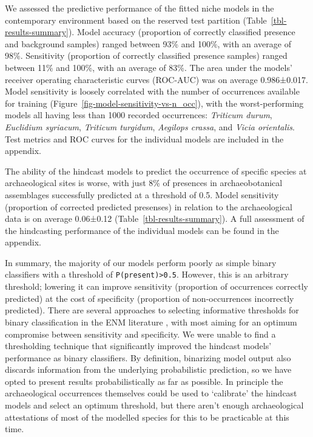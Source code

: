 \documentclass[
  authoryear,
  preprint]{elsarticle}
\begin{document}
We assessed the predictive performance of the fitted niche models in the
contemporary environment based on the reserved test partition
(Table~\ref{tbl-results-summary}). Model accuracy (proportion of
correctly classified presence and background samples) ranged between
93\% and 100\%, with an average of 98\%. Sensitivity (proportion of
correctly classified presence samples) ranged between 11\% and 100\%,
with an average of 83\%. The area under the models' receiver operating
characteristic curves (ROC-AUC) was on average 0.986±0.017. Model
sensitivity is loosely correlated with the number of occurrences
available for training (Figure~\ref{fig-model-sensitivity-vs-n_occ}),
with the worst-performing models all having less than 1000 recorded
occurrences: \emph{Triticum durum}, \emph{Euclidium syriacum},
\emph{Triticum turgidum}, \emph{Aegilops crassa}, and \emph{Vicia
orientalis}. Test metrics and ROC curves for the individual models are
included in the appendix.

The ability of the hindcast models to predict the occurrence of specific
species at archaeological sites is worse, with just 8\% of presences in
archaeobotanical assemblages successfully predicted at a threshold of
0.5. Model sensitivity (proportion of corrected predicted presenses) in
relation to the archaeological data is on average 0.06±0.12
(Table~\ref{tbl-results-summary}). A full assessment of the hindcasting
performance of the individual models can be found in the appendix.

In summary, the majority of our models perform poorly as simple binary
classifiers with a threshold of \texttt{P(present)\textgreater{}0.5}.
However, this is an arbitrary threshold; lowering it can improve
sensitivity (proportion of occurrences correctly predicted) at the cost
of specificity (proportion of non-occurrences incorrectly predicted).
There are several approaches to selecting informative thresholds for
binary classification in the ENM literature
\citep{LiuEtAl2005, LiuEtAl2013, LiuEtAl2015}, with most aiming for an
optimum compromise between sensitivity and specificity. We were unable
to find a thresholding technique that significantly improved the
hindcast models' performance as binary classifiers. By definition,
binarizing model output also discards information from the underlying
probabilistic prediction, so we have opted to present results
probabilistically as far as possible. In principle the archaeological
occurrences themselves could be used to `calibrate' the hindcast models
and select an optimum threshold, but there aren't enough archaeological
attestations of most of the modelled species for this to be practicable
at this time.
\end{document}
